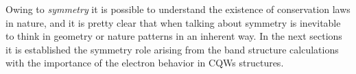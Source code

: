 Owing to \emph{symmetry} it is possible to understand the existence of conservation laws in nature\cite{Noether1918}, and it is pretty clear that when talking about symmetry is inevitable to think in geometry or nature patterns in an inherent way. In the next sections it is  established the symmetry role arising from the band structure calculations with the importance of the electron behavior in \gls{CQWs} structures.

